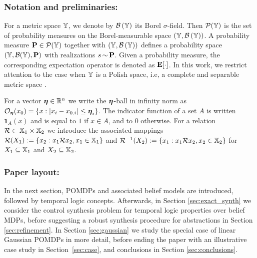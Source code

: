 \documentclass{ifacconf}
\newcommand{\ind}{\mathbf{1}}
\begin{document}
\subsubsection{Notation and preliminaries:}

For a metric space ${\mathbb{Y}}$, we denote by $\mathcal{B}\left({\mathbb{Y}}\right)$ its Borel $\sigma$-field. Then $\mathcal P({\mathbb{Y}})$ is the set of probability measures on the Borel-measurable space $({\mathbb{Y}},\mathcal{B}\left({\mathbb{Y}}\right))$. A probability measure $\mathbf{P} \in \mathcal P({\mathbb{Y}})$ together with $({\mathbb{Y}},\mathcal{B}\left({\mathbb{Y}}\right))$ defines a probability space $({\mathbb{Y}},\mathcal{B}({\mathbb{Y}}),\mathbf{P})$ with realizations $s{\,\sim\,}\mathbf{P}$. Given a probability measure, the corresponding expectation operator is denoted as $\mathbf{E}[\cdot]$. In this work, we restrict attention to the case when ${\mathbb{Y}}$ is a Polish space, i.e, a complete and separable metric space \citep{bogachev2007measure}.

For a vector ${\boldsymbol{\eta}}  \in \mathbb{R}^n$ we write the ${\boldsymbol{\eta}}$-ball in infinity norm as $\mathcal{O}_{\boldsymbol{\eta}}(x_0) = \{ x : |x_i - x_{0,i}| \leq {\boldsymbol{\eta}}_i \}$. The indicator function of a set $A$ is written $\ind_A(x)$ and is equal to $1$ if $x \in A$, and to 0 otherwise. For a relation $\mathcal{R} \subset {\mathbb{X}}_1 \times {\mathbb{X}}_2$ we introduce the associated mappings $\mathcal{R}(X_1):=\{x_2: x_1\mathcal{R} x_2, x_1 \in {\mathbb{X}}_1\}$ and  $\mathcal{R}^{-1}( X_2 ):=\{x_1: x_1\mathcal{R} x_2, x_2 \in {\mathbb{X}}_2 \}$ for $X_1 \subseteq {\mathbb{X}}_1$ and $X_2 \subseteq {\mathbb{X}}_2$.


\subsubsection{Paper layout:}

In the next section, POMDPs and associated belief models are introduced, followed by temporal logic concepts. Afterwards, in Section \ref{sec:exact_synth} we consider the control synthesis problem for temporal logic properties over belief MDPs, before suggesting a robust synthesis procedure for abstractions in Section \ref{sec:refinement}. In Section \ref{sec:gaussian} we study the special case of linear Gaussian POMDPs in more detail, before ending the paper with an illustrative case study in Section~\ref{sec:case}, and conclusions in Section \ref{sec:conclusions}.
\end{document}
